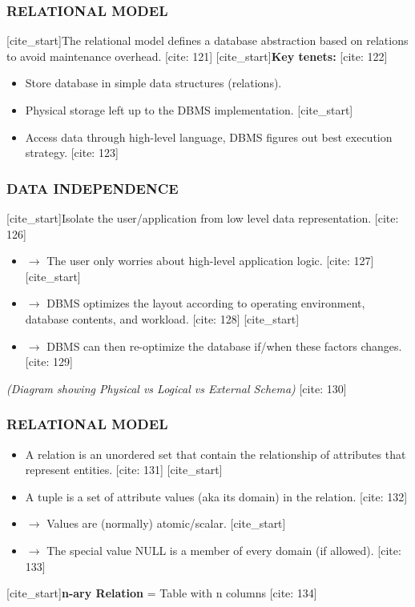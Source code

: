\documentclass[aspectratio=169]{beamer}
\begin{document}
\begin{frame}
    \frametitle{RELATIONAL MODEL}
    [cite_start]The relational model defines a database abstraction based on relations to avoid maintenance overhead. [cite: 121]
    \vspace{1em}
    [cite_start]\textbf{Key tenets:} [cite: 122]
    \begin{itemize}
        \item Store database in simple data structures (relations).
        \item Physical storage left up to the DBMS implementation.
        [cite_start]\item Access data through high-level language, DBMS figures out best execution strategy. [cite: 123]
    \end{itemize}
\end{frame}

\begin{frame}
    \frametitle{DATA INDEPENDENCE}
    [cite_start]Isolate the user/application from low level data representation. [cite: 126]
    \begin{itemize}
        [cite_start]\item $\rightarrow$ The user only worries about high-level application logic. [cite: 127]
        [cite_start]\item $\rightarrow$ DBMS optimizes the layout according to operating environment, database contents, and workload. [cite: 128]
        [cite_start]\item $\rightarrow$ DBMS can then re-optimize the database if/when these factors changes. [cite: 129]
    \end{itemize}
    \textit{(Diagram showing Physical vs Logical vs External Schema)} [cite: 130]
\end{frame}

\begin{frame}
    \frametitle{RELATIONAL MODEL}
    \begin{itemize}
        [cite_start]\item A relation is an unordered set that contain the relationship of attributes that represent entities. [cite: 131]
        [cite_start]\item A tuple is a set of attribute values (aka its domain) in the relation. [cite: 132]
        \item $\rightarrow$ Values are (normally) atomic/scalar.
        [cite_start]\item $\rightarrow$ The special value NULL is a member of every domain (if allowed). [cite: 133]
    \end{itemize}
    \vspace{1em}
    [cite_start]\textbf{n-ary Relation} = Table with n columns [cite: 134]
\end{frame}
\end{document}
